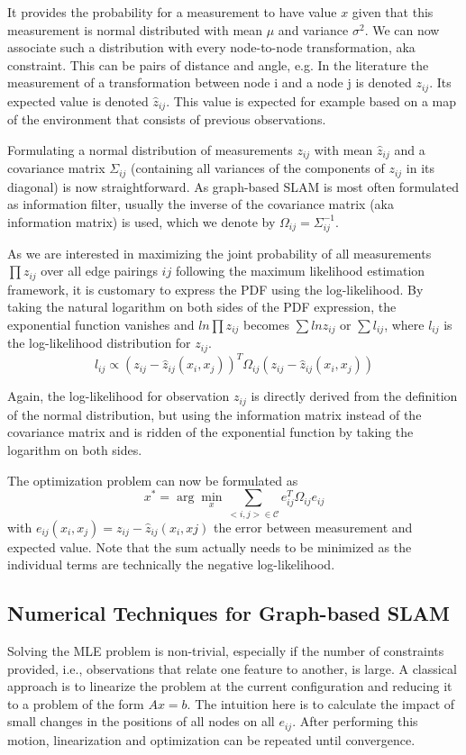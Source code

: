 \documentclass[paper=6.14in:9.21in,pagesize=pdftex,11pt,twoside,openright]{scrbook}
\begin{document}
It provides the probability for a measurement to have value $ x$ given that this measurement is normal distributed with mean $ \mu$ and variance $ \sigma^2$.  We can now associate such a distribution with every node-to-node transformation, aka constraint. This can be pairs of distance and angle, e.g. In the literature the measurement of a transformation between node i and a node j is denoted $ z_{ij}$. Its expected value is denoted $ \hat{z}_{ij}$. This value is expected for example based on a map of the environment that consists of previous observations.

Formulating a normal distribution of measurements $ z_{ij}$ with mean $ \hat{z}_{ij}$ and a covariance matrix $ \Sigma_{ij}$ (containing all variances of the components of $ z_{ij}$ in its diagonal) is now straightforward. As graph-based SLAM is most often formulated as  information filter, usually the inverse of the covariance matrix (aka information matrix) is used, which we denote by $ \Omega_{ij}=\Sigma_{ij}^{-1}$.

As we are interested in maximizing the joint probability of all measurements $ \prod{z_{ij}}$ over all edge pairings $ ij$ following the maximum likelihood estimation framework, it is customary to express the PDF using the log-likelihood. By taking the natural logarithm on both sides of the PDF expression, the exponential function vanishes and $ ln \prod{z_{ij}}$ becomes $ \sum{ ln z_{ij}}$ or $ \sum{l_{ij}}$, where $ l_{ij}$ is the log-likelihood distribution for $ z_{ij}$.
\begin{equation}
l_{ij} \propto (z_{ij}-\hat{z}_{ij}(x_i,x_j))^T\Omega_{ij}(z_{ij}-\hat{z}_{ij}(x_i,x_j))
\end{equation}

Again, the log-likelihood for observation $ z_{ij}$ is directly derived from the definition of the normal distribution, but using the information matrix instead of the covariance matrix and is ridden of the exponential function by taking the logarithm on both sides.

The optimization problem can now be formulated as
\begin{equation}
x^* = \arg \min_{x}\sum_{<i,j>\in \mathcal{C}}e_{ij}^T\Omega_{ij}e_{ij}
\end{equation}
with $ e_{ij}(x_i,x_j)=z_{ij}-\hat{z}_{ij}(x_i,xj)$ the error between measurement and expected value. Note that the sum actually needs to be minimized as the individual terms are technically the negative log-likelihood.

\subsection{Numerical Techniques for Graph-based SLAM}
Solving the MLE problem is non-trivial, especially if the number of constraints provided, i.e., observations that relate one feature to another, is large. A classical approach is to linearize the problem at the current configuration and reducing it to a problem of the form $ Ax=b$. The intuition here is to calculate the impact of small changes in the positions of all nodes on all $ e_{ij}$. After performing this motion, linearization and optimization can be  repeated until convergence. 
\end{document}

